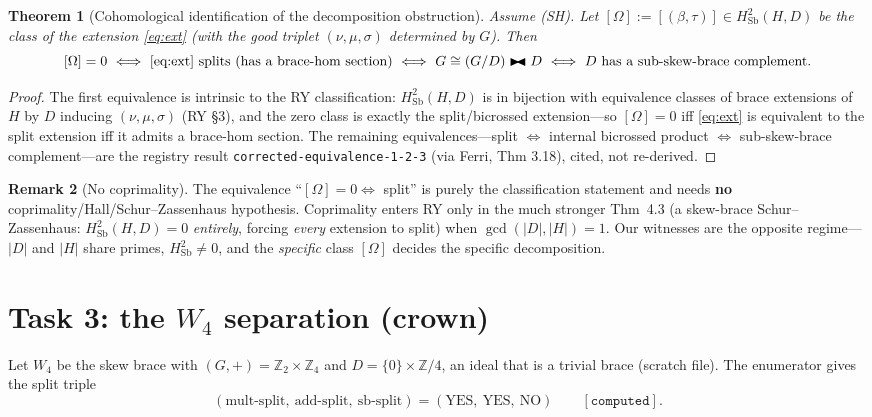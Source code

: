 \documentclass[11pt]{article}
\newtheorem{theorem}{Theorem}
\theoremstyle{definition}
\newtheorem{remark}[theorem]{Remark}
\newcommand{\Sb}{\mathrm{Sb}}
\newcommand{\Z}{\mathbb{Z}}
\newcommand{\bic}{\blacktriangleright\!\!\blacktriangleleft}
\begin{document}
\begin{theorem}[Cohomological identification of the decomposition obstruction]\label{thm:identify}
Assume {\rm(SH)}. Let $[\Omega]:=[(\beta,\tau)]\in H^2_\Sb(H,D)$ be the class of the extension
\eqref{eq:ext} (with the good triplet $(\nu,\mu,\sigma)$ determined by $G$). Then
\[
[\Omega]=0
\ \Longleftrightarrow\
\text{\eqref{eq:ext} splits (has a brace-hom section)}
\ \Longleftrightarrow\
G\cong (G/D)\bic D
\ \Longleftrightarrow\
D\ \text{has a sub-skew-brace complement.}
\]
\end{theorem}

\begin{proof}
The first equivalence is intrinsic to the RY classification: $H^2_\Sb(H,D)$ is in
bijection with equivalence classes of brace extensions of $H$ by $D$ inducing
$(\nu,\mu,\sigma)$ (RY \S3), and the zero class is exactly the split/bicrossed extension---so
$[\Omega]=0$ iff \eqref{eq:ext} is equivalent to the split extension iff it admits a brace-hom
section. The remaining equivalences---split $\Leftrightarrow$ internal bicrossed product
$\Leftrightarrow$ sub-skew-brace complement---are the registry result
\texttt{corrected-equivalence-1-2-3} (via Ferri, Thm 3.18), cited, not re-derived.
\end{proof}

\begin{remark}[No coprimality]\label{rem:nocoprime}
The equivalence ``$[\Omega]=0\Leftrightarrow$ split'' is purely the classification statement and
needs \textbf{no} coprimality/Hall/Schur--Zassenhaus hypothesis. Coprimality enters RY only in
the much stronger Thm~4.3 (a skew-brace Schur--Zassenhaus: $H^2_\Sb(H,D)=0$ \emph{entirely},
forcing \emph{every} extension to split) when $\gcd(|D|,|H|)=1$. Our witnesses are the opposite
regime---$|D|$ and $|H|$ share primes, $H^2_\Sb\neq0$, and the \emph{specific} class $[\Omega]$
decides the specific decomposition.
\end{remark}

\section{Task 3: the $W_4$ separation (crown)}\label{sec:crown}

Let $W_4$ be the skew brace with $(G,+)=\Z_2\times\Z_4$ and $D=\{0\}\times\Z/4$, an ideal that is
a trivial brace (scratch file). The enumerator gives the split triple
\[
(\text{mult-split},\ \text{add-split},\ \text{sb-split})=(\mathrm{YES},\ \mathrm{YES},\ \mathrm{NO})
\qquad[\texttt{computed}].
\]
\end{document}
